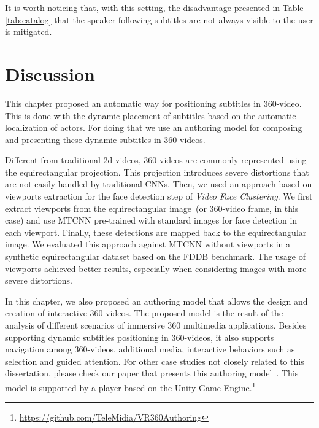 It is worth noticing that, with this setting, the disadvantage presented in Table \ref{tab:catalog} that the speaker-following subtitles are not always visible to the user is mitigated.

\section{Discussion}

This chapter proposed an automatic way for positioning subtitles in 360-video. This is done with the dynamic placement of subtitles based on the automatic localization of actors. For doing that we use an authoring model for composing and presenting these dynamic subtitles in 360-videos.

Different from traditional 2d-videos, 360-videos are commonly represented using the equirectangular projection. This projection introduces severe distortions that are not easily handled by traditional CNNs. Then, we used an approach based on viewports extraction for the face detection step of \emph{Video Face Clustering}. We first extract viewports from the equirectangular image~(or 360-video frame, in this case) and use MTCNN pre-trained with standard images for face detection in each viewport. Finally, these detections are mapped back to the equirectangular image. We evaluated this approach against MTCNN without viewports in a synthetic equirectangular dataset based on the FDDB benchmark. The usage of viewports achieved better results, especially when considering images with more severe distortions.

In this chapter, we also proposed an authoring model that allows the design and creation of interactive 360-videos. The proposed model is the result of the analysis of different scenarios of immersive 360 multimedia applications. Besides supporting dynamic subtitles positioning in 360-videos, it also supports navigation among 360-videos, additional media, interactive behaviors such as selection and guided attention. For other case studies not closely related to this dissertation, please check our paper that presents this authoring model~\cite{mendes2020authoring}. This model is supported by a player based on the Unity Game Engine.\footnote{\url{https://github.com/TeleMidia/VR360Authoring}}


